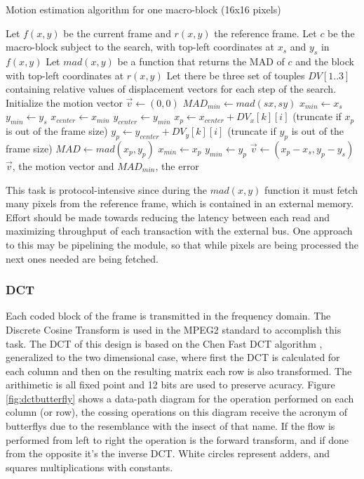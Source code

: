 \documentclass[a4paper, 12pt]{article}
\begin{document}
\begin{algorithm}[H]
\caption{Motion estimation algorithm for one macro-block (16x16 pixels)}
\label{motionalg}
\begin{algorithmic}[1]
\STATE Let $f(x,y)$ be the current frame and $r(x,y)$ the reference frame.
\STATE Let $c$ be the macro-block subject to the search, with top-left coordinates at $x_s$ and $y_s$ in $f(x,y)$
\STATE Let $mad(x,y)$ be a function that returns the MAD of $c$ and the block with top-left coordinates at $r(x,y)$
\STATE Let there be three set of touples $DV[1..3]$ containing relative values of displacement vectors for each step of the search.
\STATE Initialize the motion vector $\vec{v} \leftarrow (0,0)$
\STATE $MAD_{min} \leftarrow mad(sx,sy)$
\STATE $x_{min} \leftarrow x_s$
\STATE $y_{min} \leftarrow y_s$
\STATE $x_{center} \leftarrow x_{min}$
\STATE $y_{center} \leftarrow y_{min}$
\STATE $x_p \leftarrow x_{center} + DV_{x}[k][i]$ (truncate if $x_p$ is out of the frame size)
\STATE $y_p \leftarrow y_{center} + DV_{y}[k][i]$ (truncate if $y_p$ is out of the frame size)
\STATE $MAD \leftarrow mad(x_p, y_p)$
\STATE $x_{min} \leftarrow x_p$
\STATE $y_{min} \leftarrow y_p$
\STATE $\vec{v} \leftarrow (x_p - x_s, y_p - y_s)$
\ENDIF
\ENDFOR
\ENDFOR
\RETURN $\vec{v}$, the motion vector and $MAD_{min}$, the error
\end{algorithmic}
\end{algorithm}
	
	This task is protocol-intensive since during the $mad(x,y)$ function it must fetch many pixels from the reference frame, which is contained in an external memory. Effort should be made towards reducing the latency between each read and maximizing throughput of each transaction with the external bus. One approach to this may be pipelining the module, so that while pixels are being processed the next ones needed are being fetched.

\subsubsection{DCT}
	Each coded block of the frame is transmitted in the frequency domain. The Discrete Cosine Transform is used in the MPEG2 standard to accomplish this task.
		The DCT of this design is based on the Chen Fast DCT algorithm \cite{chendct}, generalized to the two dimensional case, where first the DCT is calculated for each column and then on the resulting matrix each row is also transformed. The arithimetic is all fixed point and 12 bits are used to preserve acuracy. Figure \ref{fig:dctbutterfly} shows a data-path diagram for the operation performed on each column (or row), the cossing operations on this diagram receive the acronym of butterflys due to the resemblance with the insect of that name. If the flow is performed from left to right the operation is the forward transform, and if done from the opposite it's the inverse DCT. White circles represent adders, and squares multiplications with constants.
\end{document}
